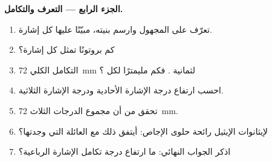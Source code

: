 \begin{problem}
\medskip
\noindent\textbf{الجزء الرابع --- التعرف والتكامل.}
\begin{enumerate}[resume]
  \item تعرّف على المجهول وارسم بنيته، مبيّنًا عليها كل
        إشارة.
  \item كم بروتونًا تمثل كل إشارة؟
  \item التكامل الكلي \qty{72}{mm} لثمانية . فكم
        مليمترًا لكل ؟
  \item احسب ارتفاع درجة الإشارة الأحادية ودرجة الإشارة الثلاثية.
  \item تحقق من أن مجموع الدرجات الثلاث \qty{72}{mm}.
  \item لإيثانوات الإيثيل رائحة حلوى الإجاص: أيتفق ذلك مع
        العائلة التي وجدتها؟
  \item اذكر الجواب النهائي: ما ارتفاع درجة تكامل
        الإشارة الرباعية؟
\end{enumerate}
\end{problem}
